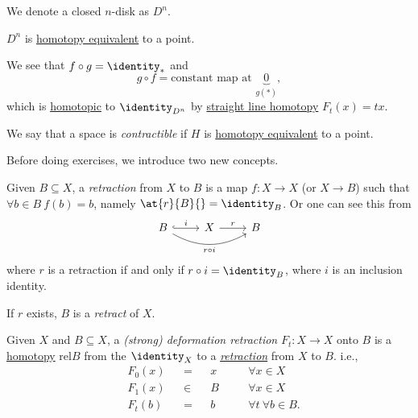 \begin{notation}
	We denote a closed \(n\)-disk as \(D^n\).
\end{notation}
\begin{eg}
	\(D^n\) is \hyperref[def:homotopy-equivalence]{homotopy equivalent} to a point.
	\begin{figure}[H]
		\centering
		\label{fig:eg:closed-disk-eq-point}
	\end{figure}

	We see that \(f\circ g = \identity_\ast\) and
	\[
		g\circ f = \text{constant map at }\underbrace{0}_{g(\ast)},
	\]
	which is \hyperref[def:homotopic]{homotopic} to \(\identity_{D^n}\) by
	\hyperref[eg:lec1:straight-line-homotopy]{straight line homotopy} \(F_t(x) = tx\).
\end{eg}

\begin{note}
	We say that a space is \emph{contractible} if \(H\) is \hyperref[def:homotopy-equivalence]{homotopy equivalent}
	to a point.
\end{note}

Before doing exercises, we introduce two new concepts.
\begin{definition}\label{def:retraction}
	Given \(B\subseteq X\), a \emph{retraction} from \(X\) to \(B\) is a map \(f\colon X\to X\) (or \(X\to B\))
	such that \(\forall b\in B\ f(b) = b\), namely \(\at{r}{B}{} = \identity_B\). Or one can see this from
	\[
		\begin{tikzcd}
			B \ar[rr, swap, bend right=30, "r \circ i"] \ar[r,hook,"i"] & X \ar[r, "r"] & B
		\end{tikzcd}
	\]
	where \(r\) is a retraction if and only if \(r\circ i = \identity_B\), where \(i\) is an inclusion identity.

	\par If \(r\) exists, \(B\) is a \emph{retract} of \(X\).
\end{definition}
\begin{definition}\label{def:deformation-retraction}
	Given \(X\) and \(B\subseteq X\), a \emph{(strong) deformation retraction} \(F_t\colon X\to X\) onto \(B\) is
	a \hyperref[def:homotopy]{homotopy} \(\mathrm{rel} B\) from the \(\identity_X\) to a \hyperref[def:retraction]{\emph{retraction}}
	from \(X\) to \(B\). i.e.,
	\[
		\begin{alignedat}{4}
			&F_0(x) &&= &&x\quad &&\forall x\in X\\
			&F_1(x) &&\in &&B\quad &&\forall x\in X\\
			&F_t(b) &&= &&b\quad &&\forall t\ \forall b\in B.
		\end{alignedat}
	\]
\end{definition}

